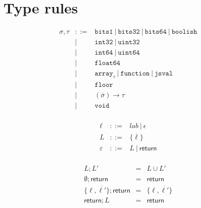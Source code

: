 \documentclass{article}
\newcommand{\funty}[2]{({#1}) \rightarrow {#2}}
\newcommand{\seq}[1]{\overline{{#1}}}
\newcommand{\boolean}{\mathtt{bits1}}
\newcommand{\uintone}{\mathtt{uint8}}
\newcommand{\uinttwo}{\mathtt{uint16}}
\newcommand{\uintfour}{\mathtt{uint32}}
\newcommand{\uinteight}{\mathtt{uint64}}
\newcommand{\intone}{\mathtt{int8}}
\newcommand{\inttwo}{\mathtt{int16}}
\newcommand{\intfour}{\mathtt{int32}}
\newcommand{\inteight}{\mathtt{int64}}
\newcommand{\float}{\mathtt{float32}}
\newcommand{\double}{\mathtt{float64}}
\newcommand{\arr}[1]{\mathtt{array}_{#1}}
\newcommand{\any}{\mathtt{jsval}}
\newcommand{\str}{\mathtt{string}}
\newcommand{\undef}{\mathtt{undefined}}
\newcommand{\void}{\mathtt{void}}
\newcommand{\nul}{\mathtt{null}}
\newcommand{\num}{\mathtt{number}}
\newcommand{\obj}{\mathtt{object}}
\newcommand{\mustret}{\mathsf{return}}
\newcommand{\seqcomp}{\mathrel{;}}
\newcommand{\word}{\mathtt{bits32}}
\newcommand{\dword}{\mathtt{bits64}}
\newcommand{\function}{\mathtt{function}}
\newcommand{\union}[2]{{#1}\mathrel{|}{#2}}
\newcommand{\boolish}{\mathtt{boolish}}
\newcommand{\floor}{\mathtt{floor}}
\begin{document}
\section{Type rules}

\[
\begin{array}{rcl}
\sigma, \tau & ::= & \boolean ~|~ \word ~|~ \dword ~|~ \boolish \\
             &  |  & \intfour ~|~ \uintfour \\
             &  |  & \inteight ~|~ \uinteight \\
             &  |  & \double \\
             &  |  & \arr{\tau} ~|~ \function ~|~ \any \\
             &  |  & \floor \\
             &  |  & \funty{\seq{\sigma}}{\tau} \\
             &  |  & \void \\
\end{array}
\]

\[
\begin{array}{rcl}
\ell        & ::= & \mathit{lab} ~|~ \epsilon \\
L           & ::= & \{ \seq{\ell} \} \\
\varepsilon & ::= & L ~|~ \mustret \\
\end{array}
\]

\[
\begin{array}{rcl}
L                       \seqcomp L'       & = & L \cup L' \\
\emptyset               \seqcomp \mustret & = & \mustret \\
\{ \ell, \seq{\ell'} \} \seqcomp \mustret & = & \{ \ell, \seq{\ell'} \} \\
\mustret                \seqcomp L        & = & \mustret \\
\end{array}
\]
\end{document}
